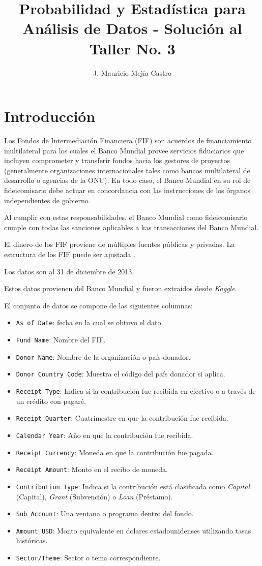 \documentclass[11pt,letterpaper]{article}
\author{J. Mauricio Mejía Castro}
\title{Probabilidad y Estadística para Análisis de Datos - Solución al Taller No. 3}
\begin{document}
\maketitle

\section{Introducción} %
Los Fondos de Intermediación Financiera (FIF) son acuerdos de financiamiento multilateral para los cuales el Banco Mundial provee servicios fiduciarios que incluyen comprometer y transferir fondos hacia los gestores de proyectos (generalmente organizaciones internacionales tales como bancos multilateral de desarrollo o agencias de la ONU). En todo caso, el Banco Mundial en su rol de fideicomisario debe actuar en concordancia con las instrucciones de los órganos independientes de gobierno.

Al cumplir con estas responsabilidades, el Banco Mundial como fideicomisario cumple con todas las sanciones aplicables a kas transacciones del Banco Mundial.

El dinero de los FIF proviene de múltiples fuentes públicas y privadas. La estructura de los FIF puede ser ajustada \cite{worldbankkaggle}.

Los datos son al 31 de diciembre de 2013.

Estos datos provienen del Banco Mundial y fueron extraídos desde {\em Kaggle}.

El conjunto de datos se compone de las siguientes columnas:
\begin{itemize}
\item {\tt As of Date}: fecha en la cual se obtuvo el dato.
\item {\tt Fund Name}: Nombre del FIF.
\item {\tt Donor Name}: Nombre de la organización o país donador.
\item {\tt Donor Country Code}: Muestra el código del país donador si aplica.
\item {\tt Receipt Type}: Indica si la contribución fue recibida en efectivo o a través de un crédito con pagaré.
\item {\tt Receipt Quarter}: Cuatrimestre en que la contribución fue recibida.
\item {\tt Calendar Year}: Año en que la contribución fue recibida.
\item {\tt Receipt Currency}: Moneda en que la contribución fue pagada.
\item {\tt Receipt Amount}: Monto en el recibo de moneda.
\item {\tt Contribution Type}: Indica si la contribución está clasificada como {\em Capital} (Capital), {\em Grant} (Subvención) o {\em Loan} (Préstamo).
\item {\tt Sub Account}: Una ventana o programa dentro del fondo.
\item {\tt Amount USD}: Monto equivalente en dolares estadounidenses utilizando tasas históricas.
\item {\tt Sector/Theme}: Sector o tema correspondiente.
\end{itemize}
\end{document}

